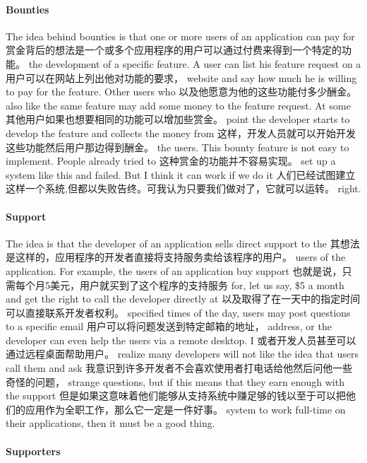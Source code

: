 \paragraph*{Bounties}

The idea behind bounties is that one or more users of an application can pay for
赏金背后的想法是一个或多个应用程序的用户可以通过付费来得到一个特定的功能。
the development of a specific feature. A user can list his feature request on a
用户可以在网站上列出他对功能的要求，
website and say how much he is willing to pay for the feature. Other users who
以及他愿意为他的这些功能付多少酬金。
also like the same feature may add some money to the feature request. At some
其他用户如果也想要相同的功能可以增加些赏金。
point the developer starts to develop the feature and collects the money from
这样，开发人员就可以开始开发这些功能然后用户那边得到酬金。
the users. This bounty feature is not easy to implement. People already tried to
这种赏金的功能并不容易实现。
set up a system like this and failed. But I think it can work if we do it
人们已经试图建立这样一个系统,但都以失败告终。可我认为只要我们做对了，它就可以运转。
right. 

\paragraph*{Support}

The idea is that the developer of an application sells direct support to the
其想法是这样的，应用程序的开发者直接将支持服务卖给该程序的用户。
users of the application. For example, the users of an application buy support
也就是说，只需每个月5美元，用户就买到了这个程序的支持服务
for, let us say, \$5 a month and get the right to call the developer directly at
以及取得了在一天中的指定时间可以直接联系开发者权利。
specified times of the day, users may post questions to a specific email
用户可以将问题发送到特定邮箱的地址，
address, or the developer can even help the users via a remote desktop. I
或者开发人员甚至可以通过远程桌面帮助用户。
realize many developers will not like the idea that users call them and ask
我意识到许多开发者不会喜欢使用者打电话给他然后问他一些奇怪的问题，
strange questions, but if this means that they earn enough with the support
但是如果这意味着他们能够从支持系统中赚足够的钱以至于可以把他们的应用作为全职工作，那么它一定是一件好事。
system to work full-time on their applications, then it must be a good thing.

\paragraph*{Supporters}

